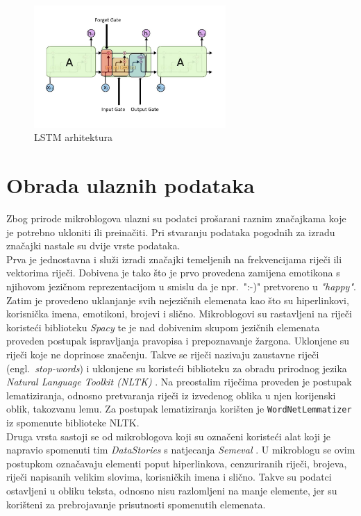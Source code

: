\documentclass[times, utf8, zavrsni]{fer}
\begin{document}
\begin{figure}[h]
	\centering
	\includegraphics[width=0.65\textwidth]{lstm}
	\caption{\gls{LSTM} arhitektura}
	\label{lstmarh}
\end{figure}



\section{Obrada ulaznih podataka}

Zbog prirode mikroblogova ulazni su podatci prošarani raznim značajkama koje je potrebno ukloniti ili preinačiti. Pri stvaranju podataka pogodnih za izradu značajki nastale su dvije vrste podataka.\\
\noindent Prva je jednostavna i služi izradi značajki temeljenih na frekvencijama riječi ili vektorima riječi. Dobivena je tako što je prvo provedena zamijena emotikona s njihovom jezičnom reprezentacijom u smislu da je npr.~":-)" pretvoreno u \emph{"happy"}. Zatim je provedeno uklanjanje svih nejezičnih elemenata kao što su hiperlinkovi, korisnička imena, emotikoni, brojevi i slično. Mikroblogovi su rastavljeni na riječi koristeći biblioteku \emph{Spacy} te je nad dobivenim skupom jezičnih elemenata proveden postupak ispravljanja pravopisa i prepoznavanje žargona. Uklonjene su riječi koje ne doprinose značenju. Takve se riječi nazivaju zaustavne riječi (engl.~\emph{stop-words}) i uklonjene su koristeći biblioteku za obradu prirodnog jezika \emph{Natural Language Toolkit (NLTK)} \citep{nltk}. Na preostalim riječima proveden je postupak lematiziranja, odnosno pretvaranja riječi iz izvedenog oblika u njen korijenski oblik, takozvanu lemu. Za postupak lematiziranja korišten je \texttt{WordNetLemmatizer} iz spomenute biblioteke \gls{NLTK}.\\
\noindent Druga vrsta sastoji se od mikroblogova koji su označeni koristeći alat koji je napravio spomenuti tim \emph{DataStories} s natjecanja \emph{Semeval} \citep{datastories-Semeval}. U mikroblogu se ovim postupkom označavaju elementi poput hiperlinkova, cenzuriranih riječi, brojeva, riječi napisanih velikim slovima, korisničkih imena i slično. Takve su podatci ostavljeni u obliku teksta, odnosno nisu razlomljeni na manje elemente, jer su korišteni za prebrojavanje prisutnosti spomenutih elemenata.
\end{document}
